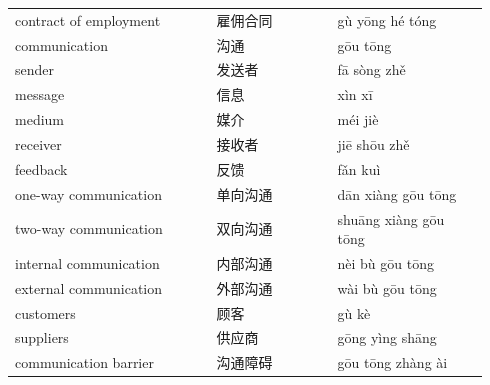\documentclass[11pt]{article}
\begin{document}
\begin{longtable}{@{}p{0.40\linewidth}p{0.24\linewidth}p{0.30\linewidth}@{}}
contract of employment & 雇佣合同 & gù yōng hé tóng \\
communication & 沟通 & gōu tōng \\
sender & 发送者 & fā sòng zhě \\
message & 信息 & xìn xī \\
medium & 媒介 & méi jiè \\
receiver & 接收者 & jiē shōu zhě \\
feedback & 反馈 & fǎn kuì \\
one-way communication & 单向沟通 & dān xiàng gōu tōng \\
two-way communication & 双向沟通 & shuāng xiàng gōu tōng \\
internal communication & 内部沟通 & nèi bù gōu tōng \\
external communication & 外部沟通 & wài bù gōu tōng \\
customers & 顾客 & gù kè \\
suppliers & 供应商 & gōng yìng shāng \\
communication barrier & 沟通障碍 & gōu tōng zhàng ài \\
\end{longtable}
\end{document}

